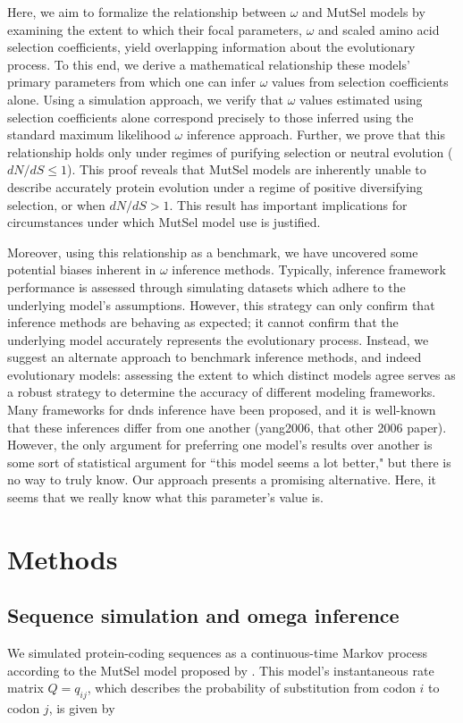 \documentclass[11pt]{article}
\begin{document}
Here, we aim to formalize the relationship between $\omega$ and MutSel models by examining the extent to which their focal parameters, $\omega$ and scaled amino acid selection coefficients, yield overlapping information about the evolutionary process. To this end, we derive a mathematical relationship these models' primary parameters from which one can infer $\omega$ values from selection coefficients alone. Using a simulation approach, we verify that $\omega$ values estimated using selection coefficients alone correspond precisely to those inferred using the standard maximum likelihood $\omega$ inference approach. Further, we prove that this relationship holds only under regimes of purifying selection or neutral evolution ($dN/dS \leq 1$). This proof reveals that MutSel models are inherently unable to describe accurately protein evolution under a regime of positive diversifying selection, or when $dN/dS > 1$. This result has important implications for circumstances under which MutSel model use is justified.

Moreover, using this relationship as a benchmark, we have uncovered some potential biases inherent in $\omega$ inference methods. Typically, inference framework performance is assessed through simulating datasets which adhere to the underlying model's assumptions. However, this strategy can only confirm that inference methods are behaving as expected; it cannot confirm that the underlying model accurately represents the evolutionary process. Instead, we suggest an alternate approach to benchmark inference methods, and indeed evolutionary models: assessing the extent to which distinct models agree serves as a robust strategy to determine the accuracy of different modeling frameworks. 
Many frameworks for dnds inference have been proposed, and it is well-known that these inferences differ from one another (yang2006, that other 2006 paper). However, the only argument for preferring one model's results over another is some sort of statistical argument for ``this model seems a lot better," but there is no way to truly know. 
Our approach presents a promising alternative. Here, it seems that we really know what this parameter's value is. 


\section*{Methods}

\subsection*{Sequence simulation and omega inference}
We simulated protein-coding sequences as a continuous-time Markov
process \cite{Yang2006} according to the MutSel model proposed by \cite{HalpernBruno1998}. This model's instantaneous rate matrix $Q = q_{ij}$, which describes the probability of substitution from codon $i$ to codon $j$, is given by 
\end{document}
